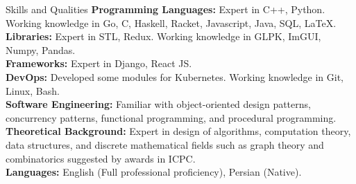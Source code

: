 \documentclass{resume} %
\begin{document}

\begin{rSection}{Skills and Qualities}
    {\bf Programming Languages:}
    Expert in C++, Python. Working knowledge in Go, C, Haskell, Racket, Javascript, Java, SQL, \LaTeX.
    \\
    {\bf Libraries:}
    Expert in STL, Redux. Working knowledge in GLPK, ImGUI, Numpy, Pandas.
    \\
    {\bf Frameworks:} Expert in Django, React JS.
    \\
    {\bf DevOps:} Developed some modules for Kubernetes. Working knowledge in Git, Linux, Bash. 
    \\
    {\bf Software Engineering:} Familiar with object-oriented design patterns, concurrency patterns, functional programming, and procedural programming.
    \\
    {\bf Theoretical Background:} Expert in design of algorithms, computation theory, data structures, and discrete mathematical fields such as
    graph theory and combinatorics suggested by awards in ICPC.
    \\
    {\bf Languages:} English (Full professional proficiency), Persian (Native).
\end{rSection}



\end{document}
